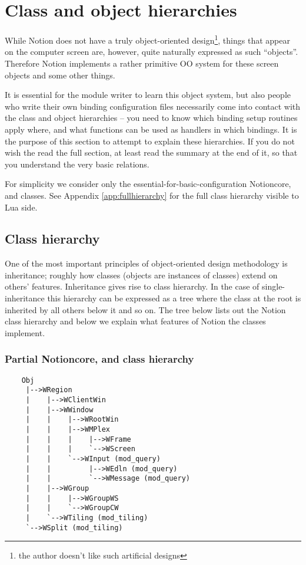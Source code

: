 
\section{Class and object hierarchies}
\label{sec:objects}

While Notion does not have a truly object-oriented design\footnote{the 
author doesn't like such artificial designs},
things that appear on the computer screen are, however, quite
naturally expressed as such ``objects''. Therefore Notion implements
a rather primitive OO system for these screen objects and some
other things. 

It is essential for the module writer to learn this object
system, but also people who write their own binding configuration files
necessarily come into contact with the class and object hierarchies
-- you need to know which binding setup routines apply where, 
and what functions can be used as handlers in which bindings.
It is the purpose of this section to attempt to explain these 
hierarchies. If you do not wish the read the full section, at least
read the summary at the end of it, so that you understand the very
basic relations.

For simplicity we consider only the essential-for-basic-configuration
Notioncore,  and  classes. 
See Appendix \ref{app:fullhierarchy} for the full class hierarchy visible
to Lua side.

\subsection{Class hierarchy}

One of the most important principles of object-oriented design methodology
is inheritance; roughly how classes (objects are instances of classes)
extend on others' features. Inheritance gives rise to class hierarchy.
In the case of single-inheritance this hierarchy can be expressed as a
tree where the class at the root is inherited by all others below it
and so on. The tree below lists out the Notion class hierarchy and below 
we explain what features of Notion the classes implement.

\subsubsection{Partial Notioncore,  and  class hierarchy}
\label{subsub:classhierarchy}

\begin{verbatim}
    Obj
     |-->WRegion
     |    |-->WClientWin
     |    |-->WWindow
     |    |    |-->WRootWin
     |    |    |-->WMPlex
     |    |    |    |-->WFrame
     |    |    |    `-->WScreen
     |    |    `-->WInput (mod_query)
     |    |         |-->WEdln (mod_query)
     |    |         `-->WMessage (mod_query)
     |    |-->WGroup
     |    |    |-->WGroupWS
     |    |    `-->WGroupCW
     |    `-->WTiling (mod_tiling)
     `-->WSplit (mod_tiling)
\end{verbatim}

